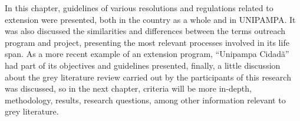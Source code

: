 In this chapter, guidelines of various resolutions and regulations related to extension were presented, both in the country as a whole and in \ac{UNIPAMPA}.
It was also discussed the similarities and differences between the terms outreach program and project, presenting the most relevant processes involved in its life span.
As a more recent example of an extension program, ``Unipampa Cidadã'' had part of its objectives and guidelines presented, finally, a little discussion about the grey literature review carried out by the participants of this research was discussed, so in the next chapter, criteria will be more in-depth, methodology, results, research questions, among other information relevant to grey literature.
